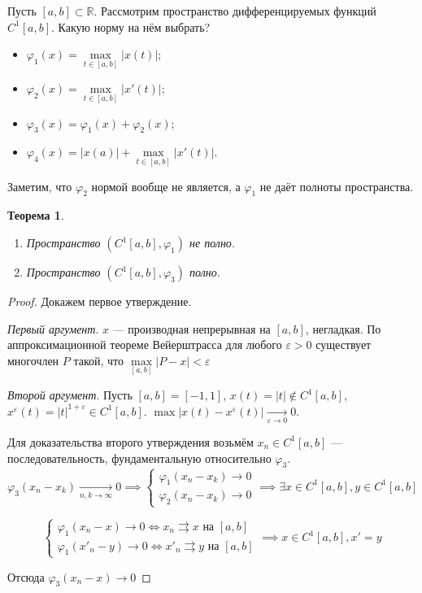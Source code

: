 \documentclass[11pt,openany,a4paper]{scrartcl}
\theoremstyle{plain}
\newtheorem{theorem}{Теорема}[subsection]
\theoremstyle{definition}
\newcommand\mb{\mathbb}
\newcommand\real{\mb R}
\newcommand{\uto}{\rightrightarrows}
\newcommand{\underto}[1]{\xrightarrow[#1]{}}
\begin{document}
Пусть $[a, b] \subset \real$.
Рассмотрим пространство дифференцируемых функций $C^1[a, b]$.
Какую норму на нём выбрать?
\begin{itemize}
    \item $\varphi_1(x) = \max\limits_{t \in [a, b]} |x(t)|$;
    \item $\varphi_2(x) = \max\limits_{t \in [a, b]} |x'(t)|$;
    \item $\varphi_3(x) = \varphi_1(x) + \varphi_2(x)$;
    \item $\varphi_4(x) = |x(a)| + \max\limits_{t \in [a, b]} |x'(t)|$.
\end{itemize}

Заметим, что $\varphi_2$ нормой вообще не является, а $\varphi_1$ не даёт полноты
пространства.
\pagebreak
\begin{theorem}
    \begin{enumerate}
        \item Пространство $(C^1 [a, b], \varphi_1)$ не полно.
        \item Пространство $(C^1 [a, b], \varphi_3)$ полно.
    \end{enumerate}
\end{theorem}

\begin{proof}
    Докажем первое утверждение.

    \emph{Первый аргумент}. $x$ — производная непрерывная на $[a, b]$, негладкая.
        По аппроксимационной теореме Вейерштрасса для любого $\varepsilon > 0$ существует многочлен
        $P$ такой, что $\max\limits_{[a, b]} |P - x| < \varepsilon$

    \emph{Второй аргумент}. Пусть $[a, b] = [-1, 1]$, $x(t) = |t| \notin C^1[a, b]$,
    $x^\varepsilon(t) = |t|^{1 + \varepsilon} \in C^1[a, b]$. $\max |x(t) - x^\varepsilon(t)| 
    \underto{\varepsilon \to 0} 0$.

    Для доказательства второго утверждения возьмём $x_n \in C^1[a, b]$ —
    последовательность, фундаментальную относительно $\varphi_3$.
    $$
    \varphi_3(x_n -x_k) \underto{n, k \to \infty} 0 \implies
    \begin{cases}
        \varphi_1(x_n - x_k) \to 0\\
        \varphi_2(x_n - x_k) \to 0
    \end{cases}
    \implies \exists x \in C^1[a, b], y \in C^1[a, b]
    $$

    $$
    \begin{cases}
        \varphi_1(x_n - x) \to 0 \iff x_n \uto x \text{ на } [a, b]\\
        \varphi_1(x'_n - y) \to 0 \iff x'_n \uto y \text{ на } [a, b]
    \end{cases}
    \implies x \in C^1[a, b], x' = y
    $$

    Отсюда $\varphi_3(x_n - x) \to 0$
\end{proof}
\end{document}
